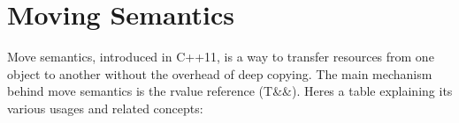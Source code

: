 \chapter{Moving Semantics}
\hypertarget{md_docs_2own__docs_2cpp__fudamentals_2moving__semantics}{}\label{md_docs_2own__docs_2cpp__fudamentals_2moving__semantics}
\label{md_docs_2own__docs_2cpp__fudamentals_2moving__semantics_autotoc_md136}%
%
 Move semantics, introduced in C++11, is a way to transfer resources from one object to another without the overhead of deep copying. The main mechanism behind move semantics is the rvalue reference ({\ttfamily T\&\&}). Here\textquotesingle{}s a table explaining its various usages and related concepts\+:

